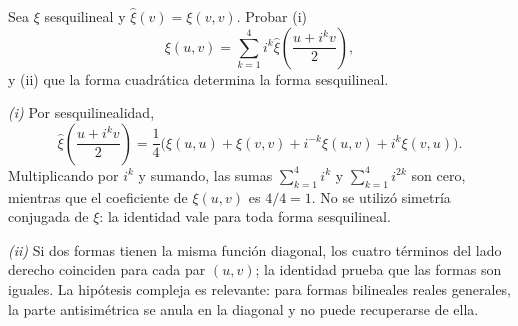 \begin{ejercicio}
Sea $\xi$ sesquilineal y $\widehat\xi(v)=\xi(v,v)$. Probar (i)
\[
 \xi(u,v)=\sum_{k=1}^{4}i^k\widehat\xi\left(\frac{u+i^kv}{2}\right),
\]
y (ii) que la forma cuadrática determina la forma sesquilineal.
\end{ejercicio}
\begin{solucion}
\emph{(i)} Por sesquilinealidad,
\[
 \widehat\xi\left(\frac{u+i^kv}{2}\right)
 =\frac14\bigl(\xi(u,u)+\xi(v,v)+i^{-k}\xi(u,v)+i^k\xi(v,u)\bigr).
\]
Multiplicando por $i^k$ y sumando, las sumas $\sum_{k=1}^{4}i^k$ y $\sum_{k=1}^{4}i^{2k}$ son cero, mientras que el coeficiente de $\xi(u,v)$ es $4/4=1$. No se utilizó simetría conjugada de $\xi$: la identidad vale para toda forma sesquilineal.

\emph{(ii)} Si dos formas tienen la misma función diagonal, los cuatro términos del lado derecho coinciden para cada par $(u,v)$; la identidad prueba que las formas son iguales. La hipótesis compleja es relevante: para formas bilineales reales generales, la parte antisimétrica se anula en la diagonal y no puede recuperarse de ella.
\end{solucion}


